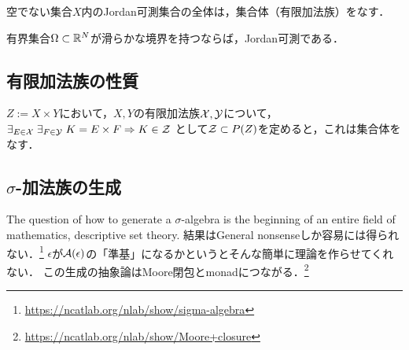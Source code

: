 \documentclass[uplatex, dvipdfmx]{jsreport}
\begin{document}
\begin{proposition}[有限加法族である]
    空でない集合$X$内のJordan可測集合の全体は，集合体（有限加法族）をなす．
\end{proposition}

\begin{theorem}
    有界集合$\Omega\subset\mathbb{R}^N$が滑らかな境界を持つならば，Jordan可測である．
\end{theorem}

\subsection{有限加法族の性質}

\begin{proposition}
    $Z:=X\times Y$において，$X,Y$の有限加法族$\mathcal{X},\mathcal{Y}$について，
    $\exists_{E\in\mathcal{X}}\;\exists_{F\in\mathcal{Y}}\;K=E\times F\Rightarrow K\in\mathcal{Z}$
    として$\mathcal{Z}\subset P(Z)$を定めると，これは集合体をなす．
\end{proposition}

\subsection{$\sigma$-加法族の生成}

\begin{tcolorbox}[colframe=ForestGreen, colback=ForestGreen!10!white,breakable,colbacktitle=ForestGreen!40!white,coltitle=black,fonttitle=\bfseries\sffamily,
title=]
    The question of how to generate a $\sigma$-algebra is the beginning of an entire field of mathematics, descriptive set theory.
    結果はGeneral nonsenseしか容易には得られない．\footnote{\url{https://ncatlab.org/nlab/show/sigma-algebra}}
    $\epsilon$が$\mathcal{A}(\epsilon)$の「準基」になるかというとそんな簡単に理論を作らせてくれない．
    この生成の抽象論はMoore閉包とmonadにつながる．\footnote{\url{https://ncatlab.org/nlab/show/Moore+closure}}
\end{tcolorbox}
\end{document}
